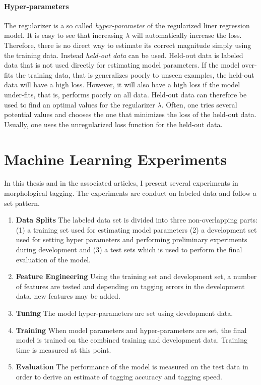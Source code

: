 \paragraph{Hyper-parameters} The regularizer is a so called {\it
  hyper-parameter} of the regularized liner regression model. It is
easy to see that increasing $\lambda$ will automatically increase the
loss. Therefore, there is no direct way to estimate its correct
magnitude simply using the training data. Instead {\it held-out data}
can be used. Held-out data is labeled data that is not used directly
for estimating model parameters. If the model over-fits the training
data, that is generalizes poorly to unseen examples, the held-out data
will have a high loss. However, it will also have a high loss if the
model under-fits, that is, performs poorly on all data. Held-out data
can therefore be used to find an optimal values for the regularizer
$\lambda$. Often, one tries several potential values and chooses the
one that minimizes the loss of the held-out data. Usually, one uses
the unregularized loss function for the held-out data.

\section{Machine Learning Experiments}

In this thesis and in the associated articles, I present several
experiments in morphological tagging. The experiments are conduct on
labeled data and follow a set pattern.

\begin{enumerate}
\item {\bf Data Splits} The labeled data set is divided into
  three non-overlapping parts: (1) a training set used for estimating
  model parameters (2) a development set used for setting hyper
  parameters and performing preliminary experiments during development
  and (3) a test sets which is used to perform the final evaluation of
  the model.
\item {\bf Feature Engineering} Using the training set and development
  set, a number of features are tested and depending on tagging errors
  in the development data, new features may be added.
\item {\bf Tuning} The model hyper-parameters are set using
  development data.
\item {\bf Training} When model parameters and hyper-parameters are
  set, the final model is trained on the combined training and
  development data. Training time is measured at this point.
\item {\bf Evaluation} The performance of the model is measured on the
  test data in order to derive an estimate of tagging accuracy and
  tagging speed.
\end{enumerate}

